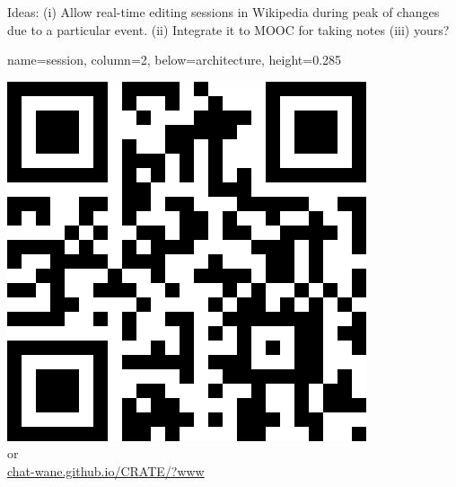 \documentclass[a1paper, fontscale=0.38, portrait]{baposter}
\newcommand{\THIRDROW}{0.285}
\begin{document}
\begin{poster}
{    Ideas: (i) Allow real-time editing sessions in Wikipedia during peak of
    changes due to a particular event. (ii) Integrate it to MOOC for taking
    notes (iii) yours?
  }

  {name=session, column=2, below=architecture, height=\THIRDROW} {
    \begin{center}
      \includegraphics[scale=0.25]{img/qrcode.png}
      \\or\\
      \url{chat-wane.github.io/CRATE/?www}
    \end{center}
  }

\end{poster}
\end{document}
